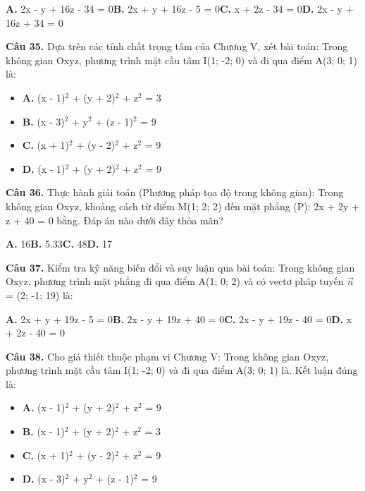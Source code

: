 \documentclass[11pt,a4paper]{article}
\begin{document}
\hspace*{1.5em}\textbf{A.} 2x - y + 16z - 34 = 0\quad\quad \textbf{B.} 2x + y + 16z - 5 = 0\quad\quad \textbf{C.} x + 2z - 34 = 0\quad\quad \textbf{D.} 2x - y + 16z + 34 = 0\par\vspace{2pt}
\textbf{\color{primary} Câu 35.} Dựa trên các tính chất trọng tâm của Chương V, xét bài toán: Trong không gian Oxyz, phương trình mặt cầu tâm I(1; -2; 0) và đi qua điểm A(3; 0; 1) là:\par
\begin{itemize}\setlength{\itemsep}{1pt}\setlength{\parskip}{0pt}
  \item[] \textbf{A.} (x - 1)$^2$ + (y + 2)$^2$ + z$^2$ = 3
  \item[] \textbf{B.} (x - 3)$^2$ + y$^2$ + (z - 1)$^2$ = 9
  \item[] \textbf{C.} (x + 1)$^2$ + (y - 2)$^2$ + z$^2$ = 9
  \item[] \textbf{D.} (x - 1)$^2$ + (y + 2)$^2$ + z$^2$ = 9
\end{itemize}\vspace{2pt}
\textbf{\color{primary} Câu 36.} Thực hành giải toán (Phương pháp tọa độ trong không gian): Trong không gian Oxyz, khoảng cách từ điểm M(1; 2; 2) đến mặt phẳng (P): 2x + 2y + z + 40 = 0 bằng. Đáp án nào dưới đây thỏa mãn?\par
\hspace*{1.5em}\textbf{A.} 16\quad\quad \textbf{B.} 5.33\quad\quad \textbf{C.} 48\quad\quad \textbf{D.} 17\par\vspace{2pt}
\textbf{\color{primary} Câu 37.} Kiểm tra kỹ năng biến đổi và suy luận qua bài toán: Trong không gian Oxyz, phương trình mặt phẳng đi qua điểm A(1; 0; 2) và có vectơ pháp tuyến $\vec{n}$ = (2; -1; 19) là:\par
\hspace*{1.5em}\textbf{A.} 2x + y + 19z - 5 = 0\quad\quad \textbf{B.} 2x - y + 19z + 40 = 0\quad\quad \textbf{C.} 2x - y + 19z - 40 = 0\quad\quad \textbf{D.} x + 2z - 40 = 0\par\vspace{2pt}
\textbf{\color{primary} Câu 38.} Cho giả thiết thuộc phạm vi Chương V: Trong không gian Oxyz, phương trình mặt cầu tâm I(1; -2; 0) và đi qua điểm A(3; 0; 1) là. Kết luận đúng là:\par
\begin{itemize}\setlength{\itemsep}{1pt}\setlength{\parskip}{0pt}
  \item[] \textbf{A.} (x - 1)$^2$ + (y + 2)$^2$ + z$^2$ = 9
  \item[] \textbf{B.} (x - 1)$^2$ + (y + 2)$^2$ + z$^2$ = 3
  \item[] \textbf{C.} (x + 1)$^2$ + (y - 2)$^2$ + z$^2$ = 9
  \item[] \textbf{D.} (x - 3)$^2$ + y$^2$ + (z - 1)$^2$ = 9
\end{itemize}\vspace{2pt}
\end{document}
